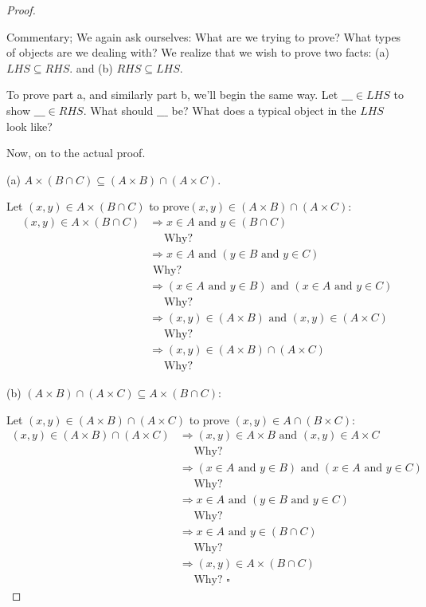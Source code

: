 \documentclass[10pt,]{book}
\theoremstyle{plain}
\theoremstyle{definition}
\theoremstyle{definition}
\theoremstyle{definition}
\begin{document}
\begin{proof}\hypertarget{proof-2}{}
Commentary; We again ask ourselves: What are we trying to prove? What types of objects are we dealing with? We realize that we wish to prove two facts: (a) \(LHS\subseteq RHS\). and (b) \(RHS\subseteq LHS\).%
\par
To prove part a, and similarly part b, we'll begin the same way. Let  \(\_\_\_ \in  LHS\) to show \(\_\_\_ \in  RHS\). What should \(\_\_\_\) be?  What does a typical object in the \(LHS\) look like?%
\par
Now, on to the actual proof.%
\par
(a) \(A\times (B\cap  C)\subseteq (A\times B)\cap (A\times C)\).%
\par
Let \((x, y) \in  A\times (B\cap C)\) to prove\((x, y) \in  (A\times B)\cap (A\times C)\):
\begin{equation*}
\begin{split}
(x, y) \in A\times (B\cap C) &\Rightarrow x \in  A \textrm{ and } y \in  (B\cap  C)\\
	&\quad \textrm{ Why? }\\
	&\Rightarrow x \in  A \textrm{ and }(y \in  B\textrm{ and } y \in  C)\\
	&\textrm{ Why? }\\
	&\Rightarrow (x \in  A \textrm{ and } y \in  B) \textrm{ and } (x \in  A \textrm{ and } y \in C)\\
	&\quad \textrm{ Why? }\\
	  &\Rightarrow  (x, y) \in  (A\times B) \textrm{ and } (x, y) \in  (A \times C)\\
	  &\quad \textrm{ Why? }\\
	   &\Rightarrow (x, y) \in  (A\times  B) \cap (A\times C)\\
	   &\quad \textrm{ Why? }
 \end{split}
 \end{equation*}
%
\par
(b) \((A\times  B)\cap (A\times C)\subseteq A\times ( B\cap C)\):

Let \((x, y) \in  (A\times  B) \cap  (A\times C)\) to prove \((x, y) \in  A \cap  ( B\times C)\):
\begin{equation*}
\begin{split}
(x, y) \in  (A\times  B)\cap (A\times C) &\Rightarrow (x, y) \in  A\times  B\textrm{ and } (x, y) \in  A\times C\\
	&\quad \textrm{ Why? }\\
	&\Rightarrow (x \in  A \textrm{ and } y \in  B) \textrm{ and } (x \in  A \textrm{ and } y \in  C)\\
	&\quad \textrm{ Why? }\\
  &\Rightarrow  x \in  A \textrm{ and } (y \in  B\textrm{ and } y \in  C)\\
  &\quad \textrm{ Why? }\\
  &\Rightarrow  x \in  A\textrm{ and } y \in  (B\cap  C)\\
  &\quad \textrm{ Why? }\\
   &\Rightarrow (x, y) \in  A \times (B\cap  C)\\
   &\quad \textrm{ Why? }  \square
 \end{split}
 \end{equation*}
%
\end{proof}
\end{document}
